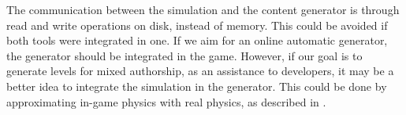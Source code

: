 The communication between the simulation and the content generator is through read and write operations on disk, instead of memory. This could be avoided if both tools were integrated in one. If we aim for an online automatic generator, the generator should be integrated in the game. However, if our goal is to generate levels for mixed authorship, as an assistance to developers, it may be a better idea to integrate the simulation in the generator. This could be done by approximating in-game physics with real physics, as described in \cite{blum1970stability}. 



